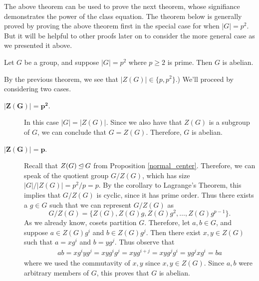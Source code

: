     The above theorem can be used to prove the next theorem, whose
    signifiance demonstrates the power of the class equation.
    The theorem below is generally
        proved by proving the above theorem first in the special case
        for when $|G| = p^2$. But it will be helpful to other proofs
        later on to consider the more general case as we presented it above.

    \begin{thm}
        Let $G$ be a group, and suppose $|G| = p^2$ where $p \ge 2$ is
        prime. Then $G$ is abelian. 
    \end{thm}

    \begin{prf}
        \textcolor{green!50!black}{By the previous theorem, we see
        that $|Z(G)| \in \{p, p^2\}$.)} We'll proceed by considering two cases.

        \begin{description}
            \item[$\mathbf{|Z(G)| = p^2}$.] 
            In this case $|G| = |Z(G)|$. Since we also have that
            $Z(G)$ is a subgroup of $G$, we can conclude that $G =
            Z(G)$. 
            Therefore, $G$ is abelian. 
             
            \item[$\mathbf{|Z(G)| = p}$.] 
            Recall that $Z(G) \unlhd
            G$ from Proposition \ref{normal_center}. Therefore, we can
            speak of the quotient group $G/Z(G)$, which has size
            $|G|/|Z(G)| = p^2/p = p$. By the corollary to Lagrange's
            Theorem, this implies that $G/Z(G)$ is cyclic, since it
            has prime order. Thus there
            exists a $g \in G$ such that we can represent $G/Z(G)$ as 
            \[
                G/Z(G) = \{Z(G), Z(G)g, Z(G)g^2, \dots, Z(G)g^{p-1}\}.
            \]
            As we already know, cosets partition $G$. Therefore, let
            $a, b \in G$, and suppose $a \in Z(G)g^i$ and $b \in
            Z(G)g^j$. Then there exist $x, y \in Z(G)$ such that 
            $a = xg^i$ and $b = yg^j$. Thus observe that 
            \begin{align*}
                ab = xg^i yg^j = xyg^ig^j = xyg^{i+j} = xyg^jg^i
                = yg^jxg^i = ba
            \end{align*}
            where we used the commutavity of $x,y$ since $x, y \in
            Z(G)$. Since $a, b$ were arbitrary members of $G$, this
            proves that $G$ is abelian.
        \end{description}
    \end{prf}

